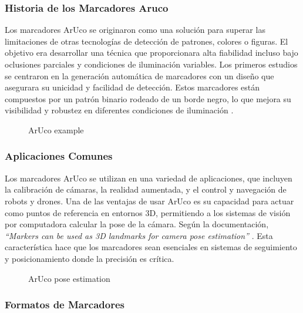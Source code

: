     \subsubsection{Historia de los Marcadores Aruco}

    Los marcadores ArUco se originaron como una solución para superar las limitaciones de otras tecnologías de detección de patrones, colores o figuras. El objetivo era desarrollar una técnica que proporcionara alta fiabilidad incluso bajo oclusiones parciales y condiciones de iluminación variables. Los primeros estudios se centraron en la generación automática de marcadores con un diseño que asegurara su unicidad y facilidad de detección. Estos marcadores están compuestos por un patrón binario rodeado de un borde negro, lo que mejora su visibilidad y robustez en diferentes condiciones de iluminación \cite{aruco_docs}.

    \begin{figure}[h!] 
    \centering 
    \caption{ArUco example} 
    \label{fig} 
    \end{figure}

    \subsubsection{Aplicaciones Comunes}

    Los marcadores ArUco se utilizan en una variedad de aplicaciones, que incluyen la calibración de cámaras, la realidad aumentada, y el control y navegación de robots y drones. Una de las ventajas de usar ArUco es su capacidad para actuar como puntos de referencia en entornos 3D, permitiendo a los sistemas de visión por computadora calcular la pose de la cámara. Según la documentación, \textit{“Markers can be used as 3D landmarks for camera pose estimation”} \cite{aruco_docs_pdf}. Esta característica hace que los marcadores sean esenciales en sistemas de seguimiento y posicionamiento donde la precisión es crítica.

    \begin{figure}[h!] 
    \centering 
    \caption{ArUco pose estimation} 
    \label{fig} 
    \end{figure}

    \subsubsection{Formatos de Marcadores}

